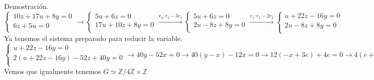 \documentclass[a4paper, 11pt]{extarticle}
\newcommand{\dem}[1]{\textcolor{gris}{\small{Demostración. #1}}}
\begin{document}
\dem{$$
\begin{cases} 
10z + 17u + 8y= 0 \\ 
6z +5u = 0 \\ 
\end{cases} \rightarrow 
\begin{cases} 
5u + 6z = 0 \\
17u+10z+8y=0\\ 
\end{cases} \xrightarrow{r_2:r_2-3r_1}   
\begin{cases} 
5u + 6z = 0 \\
2u-8z+8y=0\\ 
\end{cases}
 \xrightarrow{r_1:r_1-2r_2}   
\begin{cases} 
u + 22z-16y=0 \\
2u-8z+8y=0\\ 
\end{cases}
$$
Ya tenemos el sistema preparado para reducir la variable.
$$\begin{cases} 
u + 22z-16y=0 \\
2(u+22z-16y)-52z+40y=0\\ 
\end{cases} \rightarrow 40y - 52x = 0 \rightarrow 40(y-x) - 12x = 0 \rightarrow 12(-x + 3e) + 4e = 0 \rightarrow  4(e + 3f) = 0
$$
Vemos que igualmente tenemos \( G \simeq \mathbb{Z}/ 4 \mathbb{Z} \times
\mathbb{Z} \)
}
\end{document}
